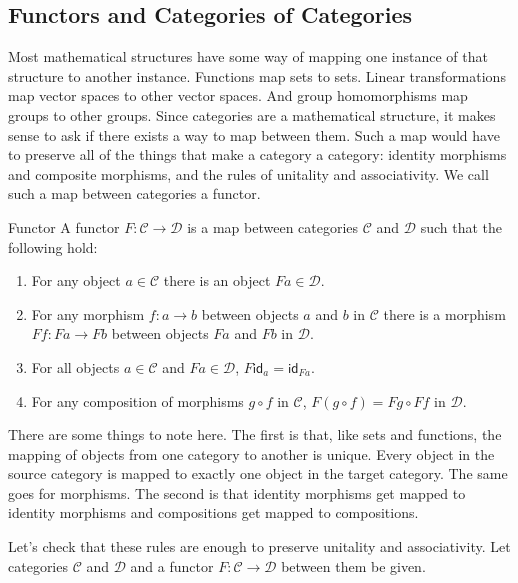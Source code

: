 \documentclass[12pt]{article}
\begin{document}
\subsection*{Functors and Categories of Categories}
Most mathematical structures have some way of mapping one instance of that structure to another instance.
Functions map sets to sets.
Linear transformations map vector spaces to other vector spaces.
And group homomorphisms map groups to other groups.
Since categories are a mathematical structure, it makes sense to ask if there exists a way to map between them.
Such a map would have to preserve all of the things that make a category a category: identity morphisms and composite morphisms, and the rules of unitality and associativity.
We call such a map between categories a functor.
\begin{definition}{Functor}{}
    A functor $F:\mathcal{C}\rightarrow\mathcal{D}$ is a map between categories $\mathcal{C}$ and $\mathcal{D}$ such that the following hold:
    \begin{enumerate}
        \item For any object $a\in\mathcal{C}$ there is an object $Fa\in\mathcal{D}$.
        \item For any morphism $f:a\rightarrow b$ between objects $a$ and $b$ in $\mathcal{C}$ there is a morphism $Ff:Fa\rightarrow Fb$ between objects $Fa$ and  $Fb$ in $\mathcal{D}$.
        \item For all objects $a\in\mathcal{C}$ and $Fa\in\mathcal{D}$, $F\mathsf{id}_a=\mathsf{id}_{Fa}$.
        \item For any composition of morphisms $g\circ f$ in $\mathcal{C}$, $F(g\circ f)=Fg\circ Ff$ in $\mathcal{D}$.
    \end{enumerate}
\end{definition}

There are some things to note here.
The first is that, like sets and functions, the mapping of objects from one category to another is unique.
Every object in the source category is mapped to exactly one object in the target category.
The same goes for morphisms.
The second is that identity morphisms get mapped to identity morphisms and compositions get mapped to compositions.

Let's check that these rules are enough to preserve unitality and associativity.
Let categories $\mathcal{C}$ and $\mathcal{D}$ and a functor $F:\mathcal{C} \rightarrow \mathcal{D}$ between them be given.
\end{document}
